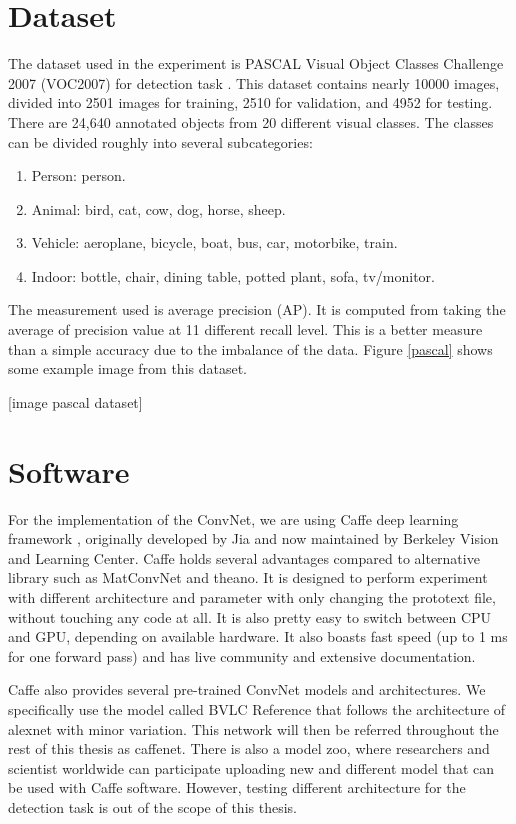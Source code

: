 \documentclass[a4paper,11pt]{kth-mag}
\begin{document}
\section{Dataset}
The dataset used in the experiment is PASCAL Visual Object Classes Challenge 2007 (VOC2007) for detection task \cite{pascal2007}. This dataset contains nearly 10000 images, divided into 2501 images for training, 2510 for validation, and 4952 for testing. There are 24,640 annotated objects from 20 different visual classes. The classes can be divided roughly into several subcategories:
\begin{enumerate}
\item Person: person.
\item Animal: bird, cat, cow, dog, horse, sheep.
\item Vehicle: aeroplane, bicycle, boat, bus, car, motorbike, train.
\item Indoor: bottle, chair, dining table, potted plant, sofa, tv/monitor.
\end{enumerate}

The measurement used is average precision (AP). It is computed from taking the average of precision value at 11 different recall level. This is a better measure than a simple accuracy due to the imbalance of the data. Figure \ref{pascal} shows some example image from this dataset.

[image pascal dataset]

\section{Software}
For the implementation of the ConvNet, we are using Caffe deep learning framework \cite{caffe}, originally developed by Jia and now maintained by Berkeley Vision and Learning Center. Caffe holds several advantages compared to alternative library such as MatConvNet and theano. It is designed to perform experiment with different architecture and parameter with only changing the prototext file, without touching any code at all. It is also pretty easy to switch between CPU and GPU, depending on available hardware. It also boasts fast speed (up to 1 ms for one forward pass) and has live community and extensive documentation.

Caffe also provides several pre-trained ConvNet models and architectures. We specifically use the model called BVLC Reference that follows the architecture of alexnet with minor variation. This network will then be referred throughout the rest of this thesis as caffenet. There is also a model zoo, where researchers and scientist worldwide can participate uploading new and different model that can be used with Caffe software. However, testing different architecture for the detection task is out of the scope of this thesis.
\end{document}
